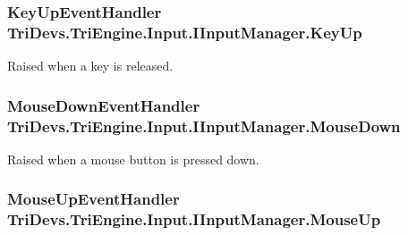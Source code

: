 \hypertarget{interface_tri_devs_1_1_tri_engine_1_1_input_1_1_i_input_manager_aca30e6a6a1501d773f75084a1352b088}{
\subsubsection[{Key\-Up}]{\setlength{\rightskip}{0pt plus 5cm}Key\-Up\-Event\-Handler Tri\-Devs.\-Tri\-Engine.\-Input.\-I\-Input\-Manager.\-Key\-Up}}\label{interface_tri_devs_1_1_tri_engine_1_1_input_1_1_i_input_manager_aca30e6a6a1501d773f75084a1352b088}


Raised when a key is released. 

\hypertarget{interface_tri_devs_1_1_tri_engine_1_1_input_1_1_i_input_manager_a8bcb1b59f102c4132543ed1b07b6124c}{
\subsubsection[{Mouse\-Down}]{\setlength{\rightskip}{0pt plus 5cm}Mouse\-Down\-Event\-Handler Tri\-Devs.\-Tri\-Engine.\-Input.\-I\-Input\-Manager.\-Mouse\-Down}}\label{interface_tri_devs_1_1_tri_engine_1_1_input_1_1_i_input_manager_a8bcb1b59f102c4132543ed1b07b6124c}


Raised when a mouse button is pressed down. 

\hypertarget{interface_tri_devs_1_1_tri_engine_1_1_input_1_1_i_input_manager_a7802c9f62acf5509a7486198229c7a27}{
\subsubsection[{Mouse\-Up}]{\setlength{\rightskip}{0pt plus 5cm}Mouse\-Up\-Event\-Handler Tri\-Devs.\-Tri\-Engine.\-Input.\-I\-Input\-Manager.\-Mouse\-Up}}\label{interface_tri_devs_1_1_tri_engine_1_1_input_1_1_i_input_manager_a7802c9f62acf5509a7486198229c7a27}


